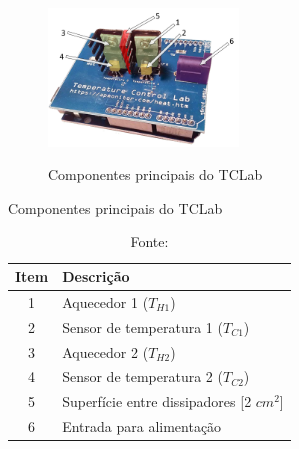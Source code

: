 
\begin{figure}[h]
	\caption{Componentes principais do TCLab}
	\begin{center}
		\includegraphics[width=0.45\textwidth]{./5_images/tclab_color_numbers.png} 
		\label{fig:tclab_description}
	\end{center}
	\centering
\end{figure}

\begin{table}[h]
	\centering
	\caption{Componentes principais do TCLab}
	\label{tab:componentes_tclabsp}
	\begin{tabular}{cl} \toprule
		{Item}			& {Descrição} 									\\ \midrule
		1		 		& Aquecedor 1 ($T_{H1}$)		 				\\
		2				& Sensor de temperatura 1 ($T_{C1}$)			\\
		3				& Aquecedor 2 ($T_{H2}$)						\\
		4				& Sensor de temperatura 2 ($T_{C2}$)			\\
		5				& Superfície entre dissipadores [2 $cm^2$]		\\
		6				& Entrada para alimentação						\\ \bottomrule
	\end{tabular}
	\caption*{Fonte: }
\end{table}

